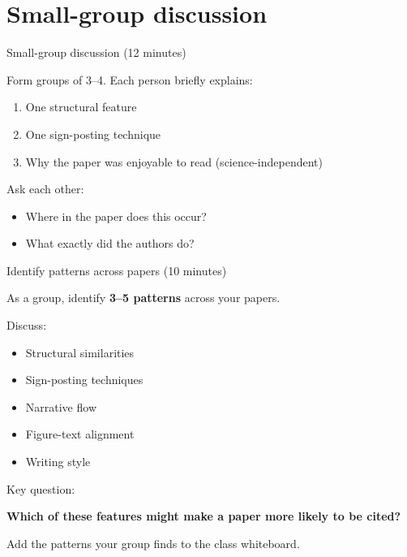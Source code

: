 \documentclass{beamer}
\begin{document}
\section{Small-group discussion}
\begin{frame}{Small-group discussion (12 minutes)}

Form groups of 3–4.
Each person briefly explains:

\begin{enumerate}
\item One structural feature
\item One sign-posting technique
\item Why the paper was enjoyable to read (science-independent)
\end{enumerate}

\vspace{0.5cm}

Ask each other:

\begin{itemize}
\item Where in the paper does this occur?
\item What exactly did the authors do?
\end{itemize}

\end{frame}

\begin{frame}{Identify patterns across papers (10 minutes)}

As a group, identify \textbf{3–5 patterns} across your papers.

Discuss:

\begin{itemize}
\item Structural similarities
\item Sign-posting techniques
\item Narrative flow
\item Figure-text alignment
\item Writing style
\end{itemize}

\vspace{0.5cm}

Key question:

\textbf{Which of these features might make a paper more likely to be cited?}

\vspace{0.5cm}
Add the patterns your group finds to the class whiteboard.

\end{frame}
\end{document}
